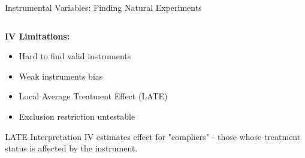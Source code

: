 \documentclass[aspectratio=169,11pt]{beamer}
\begin{document}
\begin{frame}[fragile]{Instrumental Variables: Finding Natural Experiments}
\begin{columns}
\begin{column}{0.45\textwidth}
\textbf{IV Limitations:}
\begin{itemize}
\item Hard to find valid instruments
\item Weak instruments bias
\item Local Average Treatment Effect (LATE)
\item Exclusion restriction untestable
\end{itemize}

\begin{alertblock}{LATE Interpretation}
IV estimates effect for "compliers" - those whose treatment status is affected by the instrument.
\end{alertblock}
\end{column}
\end{columns}
\end{frame}
\end{document}
